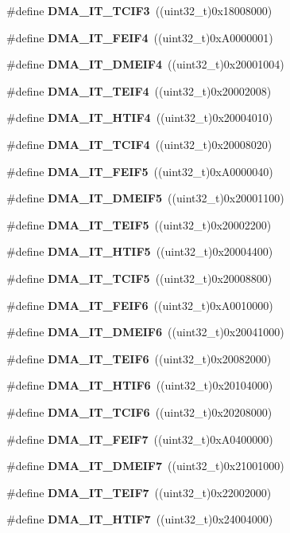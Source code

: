 \begin{DoxyCompactItemize}
\item 
\#define \textbf{ D\+M\+A\+\_\+\+I\+T\+\_\+\+T\+C\+I\+F3}~((uint32\+\_\+t)0x18008000)
\item 
\#define \textbf{ D\+M\+A\+\_\+\+I\+T\+\_\+\+F\+E\+I\+F4}~((uint32\+\_\+t)0x\+A0000001)
\item 
\#define \textbf{ D\+M\+A\+\_\+\+I\+T\+\_\+\+D\+M\+E\+I\+F4}~((uint32\+\_\+t)0x20001004)
\item 
\#define \textbf{ D\+M\+A\+\_\+\+I\+T\+\_\+\+T\+E\+I\+F4}~((uint32\+\_\+t)0x20002008)
\item 
\#define \textbf{ D\+M\+A\+\_\+\+I\+T\+\_\+\+H\+T\+I\+F4}~((uint32\+\_\+t)0x20004010)
\item 
\#define \textbf{ D\+M\+A\+\_\+\+I\+T\+\_\+\+T\+C\+I\+F4}~((uint32\+\_\+t)0x20008020)
\item 
\#define \textbf{ D\+M\+A\+\_\+\+I\+T\+\_\+\+F\+E\+I\+F5}~((uint32\+\_\+t)0x\+A0000040)
\item 
\#define \textbf{ D\+M\+A\+\_\+\+I\+T\+\_\+\+D\+M\+E\+I\+F5}~((uint32\+\_\+t)0x20001100)
\item 
\#define \textbf{ D\+M\+A\+\_\+\+I\+T\+\_\+\+T\+E\+I\+F5}~((uint32\+\_\+t)0x20002200)
\item 
\#define \textbf{ D\+M\+A\+\_\+\+I\+T\+\_\+\+H\+T\+I\+F5}~((uint32\+\_\+t)0x20004400)
\item 
\#define \textbf{ D\+M\+A\+\_\+\+I\+T\+\_\+\+T\+C\+I\+F5}~((uint32\+\_\+t)0x20008800)
\item 
\#define \textbf{ D\+M\+A\+\_\+\+I\+T\+\_\+\+F\+E\+I\+F6}~((uint32\+\_\+t)0x\+A0010000)
\item 
\#define \textbf{ D\+M\+A\+\_\+\+I\+T\+\_\+\+D\+M\+E\+I\+F6}~((uint32\+\_\+t)0x20041000)
\item 
\#define \textbf{ D\+M\+A\+\_\+\+I\+T\+\_\+\+T\+E\+I\+F6}~((uint32\+\_\+t)0x20082000)
\item 
\#define \textbf{ D\+M\+A\+\_\+\+I\+T\+\_\+\+H\+T\+I\+F6}~((uint32\+\_\+t)0x20104000)
\item 
\#define \textbf{ D\+M\+A\+\_\+\+I\+T\+\_\+\+T\+C\+I\+F6}~((uint32\+\_\+t)0x20208000)
\item 
\#define \textbf{ D\+M\+A\+\_\+\+I\+T\+\_\+\+F\+E\+I\+F7}~((uint32\+\_\+t)0x\+A0400000)
\item 
\#define \textbf{ D\+M\+A\+\_\+\+I\+T\+\_\+\+D\+M\+E\+I\+F7}~((uint32\+\_\+t)0x21001000)
\item 
\#define \textbf{ D\+M\+A\+\_\+\+I\+T\+\_\+\+T\+E\+I\+F7}~((uint32\+\_\+t)0x22002000)
\item 
\#define \textbf{ D\+M\+A\+\_\+\+I\+T\+\_\+\+H\+T\+I\+F7}~((uint32\+\_\+t)0x24004000)

\end{DoxyCompactItemize}
